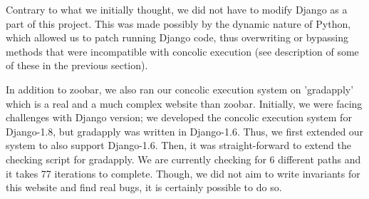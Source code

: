 \documentclass{scrartcl}
\begin{document}
Contrary to what we initially thought, we did not have to modify Django as a
part of this project. This was made possibly by the dynamic nature of Python,
which allowed us to patch running Django code, thus overwriting or bypassing
methods that were incompatible with concolic execution (see description of some
of these in the previous section).

In addition to zoobar, we also ran our concolic execution system on
'gradapply' which is a real and a much complex website than zoobar.
Initially, we were facing challenges with Django version; we developed
the concolic execution system for Django-1.8, but gradapply was written
in Django-1.6. Thus, we first extended our system to also support
Django-1.6. Then, it was straight-forward to extend the checking script
for gradapply. We are currently checking for 6 different paths and it takes
77 iterations to complete. Though, we did not aim to write invariants for
this website and find real bugs, it is certainly possible to do so.
\end{document}
